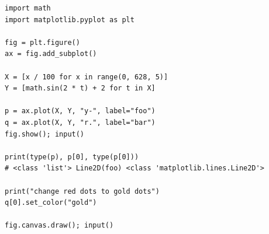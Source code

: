 
\begin{frame}[fragile]
%
\vspace{-5pt}
\begin{codebox}
\begin{verbatim}
import math
import matplotlib.pyplot as plt

fig = plt.figure()
ax = fig.add_subplot()

X = [x / 100 for x in range(0, 628, 5)]
Y = [math.sin(2 * t) + 2 for t in X]

p = ax.plot(X, Y, "y-", label="foo")
q = ax.plot(X, Y, "r.", label="bar")
fig.show(); input()

print(type(p), p[0], type(p[0]))
# <class 'list'> Line2D(foo) <class 'matplotlib.lines.Line2D'>

print("change red dots to gold dots")
q[0].set_color("gold")

fig.canvas.draw(); input()
\end{verbatim}
\end{codebox}
%
\end{frame}


